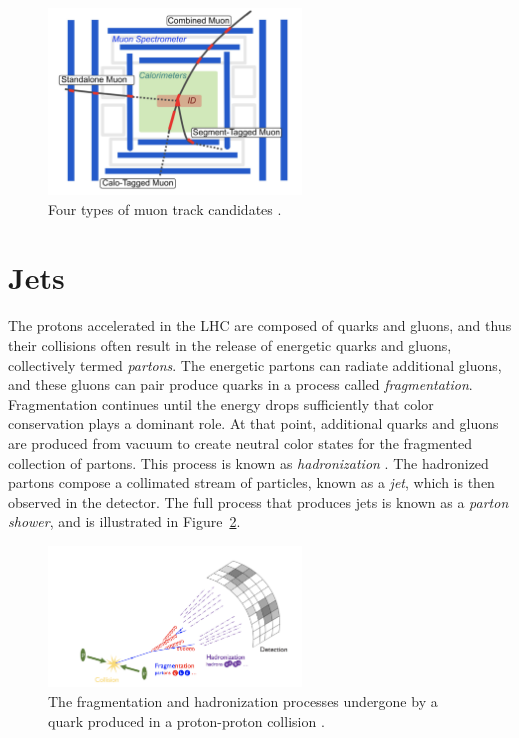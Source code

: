 \begin{figure}[h]
        \centering
	\includegraphics[width=0.6\textwidth]{figures/ch5/muon_tracks}
	\caption{Four types of muon track candidates \cite{muon_id}. }
	\label{fig:muon_tracks}
\end{figure}

\section{Jets}
The protons accelerated in the LHC are composed of quarks and gluons, and thus their collisions often result in the release of energetic quarks and gluons, collectively termed \textit{partons}. The energetic partons can radiate additional gluons, and these gluons can pair produce quarks in a process called \textit{fragmentation}. Fragmentation continues until the energy drops sufficiently that color conservation plays a dominant role. At that point, additional quarks and gluons are produced from vacuum to create neutral color states for the fragmented collection of partons. This process is known as \textit{hadronization} \cite{fragmentation}. The hadronized partons compose a collimated stream of particles, known as a \textit{jet}, which is then observed in the detector. The full process that produces jets is known as a \textit{parton shower}, and is illustrated in Figure~\ref{fig:parton_shower}. 

\begin{figure}[h]
        \centering
	\includegraphics[width=0.6\textwidth]{figures/ch5/parton_shower}
	\caption{The fragmentation and hadronization processes undergone by a quark produced in a proton-proton collision \cite{frag_im}. }
	\label{fig:parton_shower}
\end{figure}

